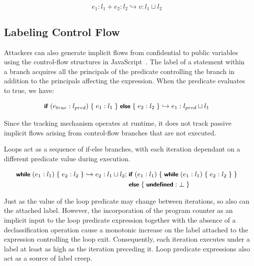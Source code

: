 \begin{equation}
\label{eqn:formal-addition}
  e_1:l_1 + e_2:l_2 \hookrightarrow v:l_1 \sqcup l_2
\end{equation}

\subsection{Labeling Control Flow}
\label{sec:formal-semantics}

Attackers can also generate implicit flows from confidential to public variables using the control-flow structures in JavaScript~\cite[p.~135]{guha.etal+10}.
The label of a statement within a branch acquires all the principals of the predicate controlling the branch in addition to the principals affecting the expression.
When the predicate evaluates to true, we have:

\newcommand{\kw}[1]{\text{\small\textsf{\textbf{#1}}}}

\begin{equation}
  \kw{if}\;(e_{true}:l_{pred})\;\{\;e_1:l_1\;\}\;\kw{else}\;\{\;e_2:l_2\;\} \hookrightarrow e_1:l_{pred} \sqcup l_1
\end{equation}

Since the tracking mechanism operates at runtime, it does not track passive implicit flows arising from control-flow branches that are not executed.

Loops act as a sequence of if-else branches, with each iteration dependant on a different predicate value during execution.

\begin{equation}
\begin{split}
  \kw{while}\;(e_1:l_1)\;\{\;e_2:l_2\;\} \hookrightarrow
  e_2:l_1 \sqcup l_2 ;\; &\kw{if}\;(e_1:l_1)\;\{\;
  \kw{while}\;(e_1:l_1)\;\{\;e_2:l_2\;\}\;\}  \\
  &\kw{else}\;\{\;\kw{undefined}:\bot\;\}
\end{split}
\end{equation}

Just as the value of the loop predicate may change between iterations, so also can the attached label.
However, the incorporation of the program counter as an implicit input to the loop predicate expression together with the absence of a declassification operation cause a monotonic increase on the label attached to the expression controlling the loop exit.
Consequently, each iteration executes under a label at least as high as the iteration preceding it.
Loop predicate expressions also act as a source of label creep.

